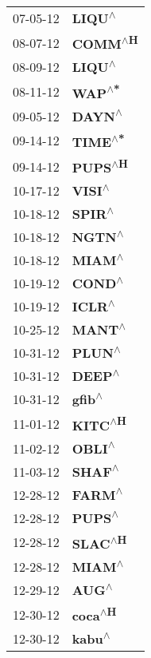 \begin{supertabular}{p{0.08\textwidth}p{0.2\textwidth}}
 07-05-12 &    \textbf{LIQU\textsuperscript{$\wedge$}} \\
 08-07-12 &   \textbf{COMM\textsuperscript{$\wedge$H}} \\
 08-09-12 &    \textbf{LIQU\textsuperscript{$\wedge$}} \\
 08-11-12 &    \textbf{WAP\textsuperscript{$\wedge$*}} \\
 09-05-12 &    \textbf{DAYN\textsuperscript{$\wedge$}} \\
 09-14-12 &   \textbf{TIME\textsuperscript{$\wedge$*}} \\
 09-14-12 &   \textbf{PUPS\textsuperscript{$\wedge$H}} \\
 10-17-12 &    \textbf{VISI\textsuperscript{$\wedge$}} \\
 10-18-12 &    \textbf{SPIR\textsuperscript{$\wedge$}} \\
 10-18-12 &    \textbf{NGTN\textsuperscript{$\wedge$}} \\
 10-18-12 &    \textbf{MIAM\textsuperscript{$\wedge$}} \\
 10-19-12 &    \textbf{COND\textsuperscript{$\wedge$}} \\
 10-19-12 &    \textbf{ICLR\textsuperscript{$\wedge$}} \\
 10-25-12 &    \textbf{MANT\textsuperscript{$\wedge$}} \\
 10-31-12 &    \textbf{PLUN\textsuperscript{$\wedge$}} \\
 10-31-12 &    \textbf{DEEP\textsuperscript{$\wedge$}} \\
 10-31-12 &    \textbf{gfib\textsuperscript{$\wedge$}} \\
 11-01-12 &   \textbf{KITC\textsuperscript{$\wedge$H}} \\
 11-02-12 &    \textbf{OBLI\textsuperscript{$\wedge$}} \\
 11-03-12 &    \textbf{SHAF\textsuperscript{$\wedge$}} \\
 12-28-12 &    \textbf{FARM\textsuperscript{$\wedge$}} \\
 12-28-12 &    \textbf{PUPS\textsuperscript{$\wedge$}} \\
 12-28-12 &   \textbf{SLAC\textsuperscript{$\wedge$H}} \\
 12-28-12 &    \textbf{MIAM\textsuperscript{$\wedge$}} \\
 12-29-12 &     \textbf{AUG\textsuperscript{$\wedge$}} \\
 12-30-12 &   \textbf{coca\textsuperscript{$\wedge$H}} \\
 12-30-12 &    \textbf{kabu\textsuperscript{$\wedge$}} \\

\end{supertabular}
